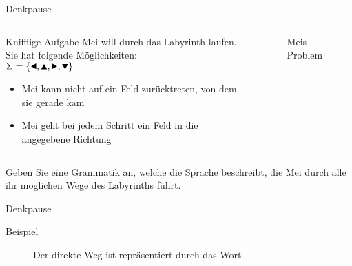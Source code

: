 {
\begin{frame}{Denkpause}
    \begin{columns}
        \begin{alertblock}{Knifflige Aufgabe}
            Mei will durch das Labyrinth laufen. Sie hat folgende Möglichkeiten:\\
            $\Sigma = \{\text{\Rewind}, \text{\MoveUp}, \text{\Forward}, \text{\MoveDown}\}$
            \begin{itemize}
                \item Mei kann nicht auf ein Feld zurücktreten, von dem sie gerade kam
                \item Mei geht bei jedem Schritt ein Feld in die angegebene Richtung
            \end{itemize}
        \end{alertblock}
        \begin{figure}
            \centering
            
            \caption{Meis Problem}

        \end{figure}
    \end{columns}
    \alert{Geben Sie eine Grammatik an, welche die Sprache beschreibt, die Mei durch alle ihr möglichen Wege des Labyrinths führt.}
\end{frame}
}

{
\begin{frame}{Denkpause}
    \begin{alertblock}{Beispiel}
        \begin{figure}
            \centering
            \def\labyrinthVariant{Direkt}
            \def\labyrinthSize{0.9\textwidth}
            
            \caption{Der direkte Weg ist repräsentiert durch das Wort \alert{\MoveDown\Forward\Forward\Forward\Forward\Forward\Forward}}
        \end{figure}
    \end{alertblock}
\end{frame}
}

